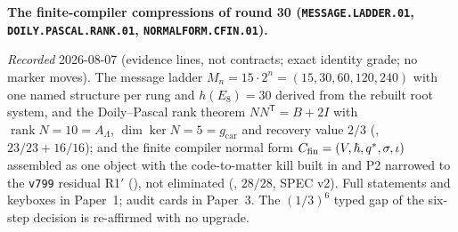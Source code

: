 \documentclass[11pt,a4paper]{article}
\newcommand{\gcar}{g_{\mathrm{car}}}
\begin{document}
\par\smallskip\noindent\textbf{The finite-compiler compressions
of round 30 (\texttt{MESSAGE.LADDER.01},
\texttt{DOILY.PASCAL.RANK.01}, \texttt{NORMALFORM.CFIN.01}).}
{\sloppy
\emph{Recorded} 2026-08-07 (evidence lines, not contracts; exact
identity grade; no marker moves).  The message ladder
$M_n = 15\cdot2^n = (15, 30, 60, 120, 240)$ with one named
structure per rung and $h(E_8) = 30$ derived from the rebuilt
root system, and the Doily--Pascal rank theorem
$NN^{\mathsf T} = B + 2I$ with $\operatorname{rank} N = 10 =
A_\Lambda$, $\dim\ker N = 5 = \gcar$ and recovery value $2/3$
(, $23/23 + 16/16$); and the
finite compiler normal form $C_{\rm fin} = (V, \hbar, q^{*},
\sigma, \iota)$ assembled as one object with the code-to-matter
kill built in and P2 narrowed to the \texttt{v799} residual
R1$'$ (\mC), not eliminated
(, $28/28$, SPEC v2).  Full
statements and keyboxes in Paper~1; audit cards in Paper~3.  The
$(1/3)^6$ typed gap of the six-step decision is re-affirmed with
no upgrade.\par}
\end{document}
